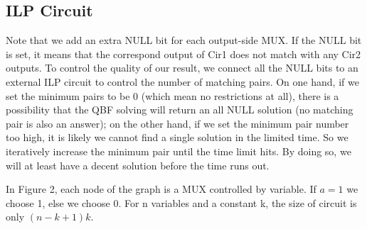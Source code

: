 \subsection{ILP Circuit}
 Note that we add an extra NULL bit for each output-side MUX. If the NULL bit is set, it means that the correspond output of Cir1 does not match with any Cir2 outputs.
To control the quality of our result, we connect all the NULL bits to an external ILP circuit to control the number of matching pairs. On one hand, if we set the minimum pairs to be 0 (which mean no restrictions at all), there is a possibility that the QBF solving will return an all NULL solution (no matching pair is also an answer); on the other hand, if we set the minimum pair number too high, it is likely we cannot find a single solution in the limited time. So we iteratively increase the minimum pair until the time limit hits. By doing so, we will at least have a decent solution before the time runs out.

In Figure 2, each node of the graph is a MUX controlled by variable. If $a=1$ we choose 1, else we choose 0. For n variables and a constant k, the size of circuit is only $(n - k + 1)k$.
    
